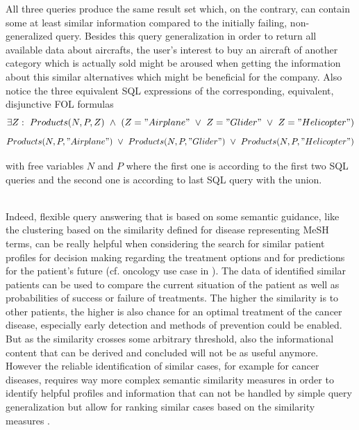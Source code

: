 \begin{exmp}
All three queries produce the same result set which, on the contrary, can contain some at least similar information compared to the initially failing,
non-generalized query. Besides this query generalization in order to return all available data about aircrafts, the user's interest to buy an aircraft of
another category which is actually sold might be aroused when getting the information about this similar alternatives which might be beneficial for the
company. Also notice the three equivalent SQL expressions of the corresponding, equivalent, disjunctive FOL formulas
\begin{equation*}
\exists Z:~Products(N,P,Z)~\land~(Z="Airplane"~\lor~Z="Glider"~\lor~Z="Helicopter") \notag
\end{equation*}
\begin{equation}
    Products(N,P,"Airplane")~\lor~Products(N,P,"Glider")~\lor~Products(N,P,"Helicopter") \notag
\end{equation}   

with free variables $N$ and $P$ where the first one is according to the first two SQL queries and the second one is according to last SQL query with the 
union.
\end{exmp}

$ $\\
Indeed, flexible query answering that is based on some semantic guidance, like the clustering based on the similarity defined for disease representing 
MeSH terms, can be really helpful when considering the search for similar patient profiles for decision making regarding the treatment options and for 
predictions for the patient's future (cf. oncology use case in \cite{Haarbrandt2018}). The data of identified similar patients can be used to compare the
current situation of the patient as well as probabilities of success or failure of treatments. The higher the similarity is to other patients, the higher 
is also chance for an optimal treatment of the cancer disease, especially early detection and methods of prevention could be enabled. But as the 
similarity crosses some arbitrary threshold, also the informational content that can be derived and concluded will not be as useful anymore.
However the reliable identification of similar cases, for example for cancer diseases, requires way more complex semantic similarity measures in order 
to identify helpful profiles and information that can not be handled by simple query generalization but allow for ranking similar cases based on the
similarity measures \citep{Haarbrandt2018}.


